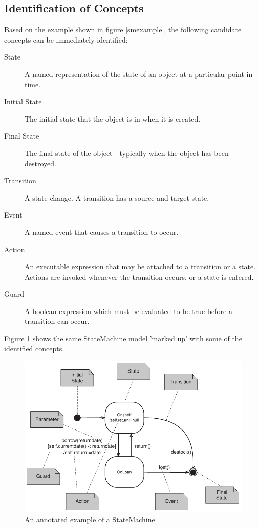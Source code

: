 \subsection{Identification of Concepts}

Based on the example shown in figure \ref{smexample}, the
following candidate concepts can be immediately identified:

\begin{description}
\item [State]  A named representation of the state of an object at
a particular point in time.

\item [Initial State] The initial state that the object is
in when it is created.

\item [Final State] The final state of the object - typically when
the object has been destroyed.

\item [Transition] A state change. A transition has a source and target
state.

\item [Event] A named event that causes a transition to occur.

\item [Action] An executable expression that may be attached to
a transition or a state. Actions are invoked whenever the
transition occurs, or a state is entered.

\item [Guard] A boolean expression which must be evaluated to
be true before a transition can occur.

\end{description}

Figure \ref{stmannotated} shows the same StateMachine model 'marked
up' with some of the identified concepts.

\begin{figure}[htb]
\begin{center}
\includegraphics[width=13cm]{AbstractSyntax/figures/SMAnnotated.pdf}
\caption{An annotated example of a StateMachine}
\label{stmannotated}
\end{center}
\end{figure}

